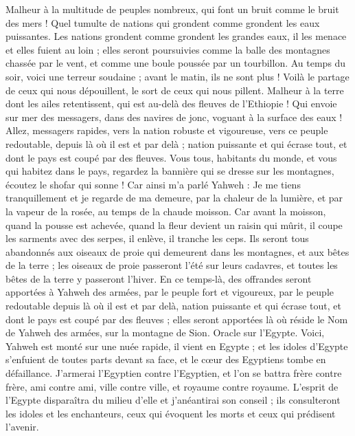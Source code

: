 \begin{multicols}{2}
Malheur à la multitude de peuples nombreux, qui font un bruit comme le bruit des mers ! Quel tumulte de nations qui grondent comme grondent les eaux puissantes.
Les nations grondent comme grondent les grandes eaux, il les menace et elles fuient au loin ; elles seront poursuivies comme la balle des montagnes chassée par le vent, et comme une boule poussée par un tourbillon.
Au temps du soir, voici une terreur soudaine ; avant le matin, ils ne sont plus ! Voilà le partage de ceux qui nous dépouillent, le sort de ceux qui nous pillent.
\VerseOne{}Malheur à la terre dont les ailes retentissent, qui est au-delà des fleuves de l'Ethiopie !
Qui envoie sur mer des messagers, dans des navires de jonc, voguant à la surface des eaux ! Allez, messagers rapides, vers la nation robuste et vigoureuse, vers ce peuple redoutable, depuis là où il est et par delà ; nation puissante et qui écrase tout, et dont le pays est coupé par des fleuves.
Vous tous, habitants du monde, et vous qui habitez dans le pays, regardez la bannière qui se dresse sur les montagnes, écoutez le shofar qui sonne !
Car ainsi m'a parlé Yahweh : Je me tiens tranquillement et je regarde de ma demeure, par la chaleur de la lumière, et par la vapeur de la rosée, au temps de la chaude moisson.
Car avant la moisson, quand la pousse est achevée, quand la fleur devient un raisin qui mûrit, il coupe les sarments avec des serpes, il enlève, il tranche les ceps.
Ils seront tous abandonnés aux oiseaux de proie qui demeurent dans les montagnes, et aux bêtes de la terre ; les oiseaux de proie passeront l'été sur leurs cadavres, et toutes les bêtes de la terre y passeront l'hiver.
En ce temps-là, des offrandes seront apportées à Yahweh des armées, par le peuple fort et vigoureux, par le peuple redoutable depuis là où il est et par delà, nation puissante et qui écrase tout, et dont le pays est coupé par des fleuves ; elles seront apportées là où réside le Nom de Yahweh des armées, sur la montagne de Sion.
\VerseOne{}Oracle sur l'Egypte. Voici, Yahweh est monté sur une nuée rapide, il vient en Egypte ; et les idoles d'Egypte s'enfuient de toutes parts devant sa face, et le cœur des Egyptiens tombe en défaillance.
J'armerai l'Egyptien contre l'Egyptien, et l'on se battra frère contre frère, ami contre ami, ville contre ville, et royaume contre royaume.
L'esprit de l'Egypte disparaîtra du milieu d'elle et j'anéantirai son conseil ; ils consulteront les idoles et les enchanteurs, ceux qui évoquent les morts et ceux qui prédisent l'avenir.

\end{multicols}
